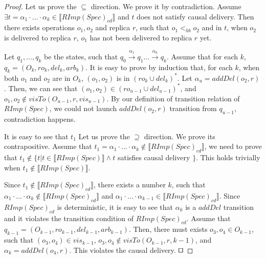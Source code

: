 \begin {proof}

Let us prove the $\subseteq$ direction. We prove it by contradiction. Assume $\exists t =\alpha_1 \cdot \ldots \cdot \alpha_k \in \llbracket RImp(Spec)_{\mathit{cd}} \rrbracket$ and $t$ does not satisfy causal delivery. Then there exists operations $o_1,o_2$ and replica $r$, such that $o_1 <_{hb} o_2$ and in $t$, when $o_2$ is delivered to replica $r$, $o_1$ has not been delivered to replica $r$ yet.

Let $q_1,\ldots,q_k$ be the states, such that $q_0 {\xrightarrow{\alpha_1}} q_1 \ldots {\xrightarrow{\alpha_k}} q_k$. Assume that for each $k$, $q_k = (O_k,\mathit{ro}_k,\mathit{del}_k,\mathit{arb}_k)$. It is easy to prove by induction that, for each $k$, when both $o_1$ and $o_2$ are in $O_k$, $(o_1,o_2)$ is in $(\mathit{ro}_k \cup \mathit{del}_k)^*$. Let $\alpha_u = addDel(o_2,r)$. Then, we can see that $(o_1,o_2) \in (\mathit{ro}_{u-1} \cup \mathit{del}_{u-1})^*$, and $o_1,o_2 \notin visTo(O_{u-1},r,\mathit{vis}_{u-1})$. By our definition of transition relation of $RImp(Spec)$, we could not launch $addDel(o_2,r)$ transition from $q_{u-1}$, contradiction happens.

It is easy to see that $t_1$ Let us prove the $\supseteq$ direction. We prove its contrapositive. Assume that $t_1 =\alpha_1 \cdot \ldots \cdot \alpha_k \notin \llbracket RImp(Spec)_{\mathit{cd}} \rrbracket$, we need to prove that $t_1 \notin \{ t \vert t \in \llbracket RImp(Spec) \rrbracket \wedge t$ satisfies causal delivery $\}$. This holds trivially when $t_1 \notin \llbracket RImp(Spec) \rrbracket$.

Since $t_1 \notin \llbracket RImp(Spec)_{\mathit{cd}} \rrbracket$, there exists a number $k$, such that $\alpha_1 \cdot \ldots \cdot \alpha_k \notin \llbracket RImp(Spec)_{\mathit{cd}} \rrbracket$ and $\alpha_1 \cdot \ldots \cdot \alpha_{k-1} \in \llbracket RImp(Spec)_{\mathit{cd}} \rrbracket$. Since $RImp(Spec)_{\mathit{cd}}$ is deterministic, it is easy to see that $\alpha_k$ is a $addDel$ transition and it violates the transition condition of $RImp(Spec)_{\mathit{cd}}$. Assume that $q_{\mathit{k-1}} = (O_{k-1},\mathit{ro}_{k-1},\mathit{del}_{k-1},\mathit{arb}_{k-1})$. Then, there must exists $o_3,o_4 \in O_{k-1}$, such that $(o_3,o_4) \in \mathit{vis}_{k-1}$, $o_3,o_4 \notin visTo(O_{k-1},r,\mathit{k-1})$, and $\alpha_k = addDel(o_4,r)$. This violates the causal delivery. $\qed$
\end {proof}




